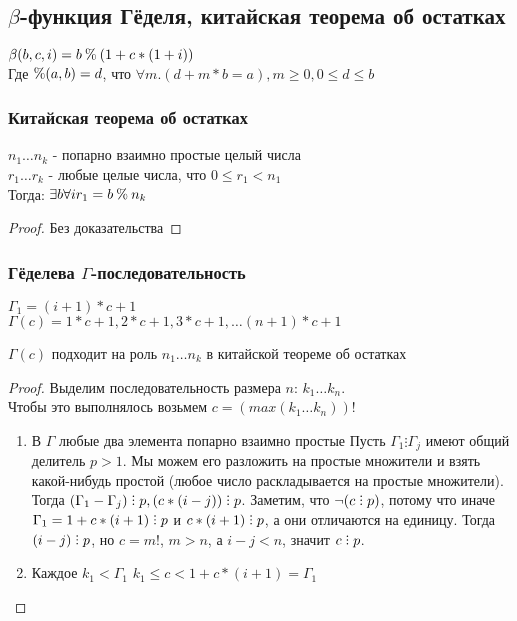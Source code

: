 \subsection{\texorpdfstring{$\beta$}{Бета}-функция Гёделя, китайская теорема об остатках}
\label{sec-11-3}
$\beta(b, c, i) = b \mathbin{\%} (1 + c * (1 + i))$\\
Где $\mathbin{\%}(a, b) = d$, что $\forall m . (d + m * b = a), m \geq 0, 0 \leq d \leq b$

\subsubsection{Китайская теорема об остатках}
\label{sec-11-3-1}
\begin{theorem}
$n_1\dots n_k$ - попарно взаимно простые целый числа\\
$r_1\dots r_k$ - любые целые числа, что $0 \leq r_1 < n_1$\\
Тогда: $\exists b \forall i  r_1 = b \mathbin{\%} n_k$
\end{theorem}
\begin{proof}
Без доказательства
\end{proof}

\subsubsection{Гёделева \texorpdfstring{$\Gamma$}{Г}-последовательность}
\label{sec-11-3-2}
$\Gamma_1 = (i + 1) * c + 1$\\
$\Gamma(c) = 1 * c + 1, 2 * c + 1, 3 * c + 1, \ldots (n + 1) * c + 1$
\begin{theorem}
$\Gamma(c)$ подходит на роль $n_1 \ldots n_k$ в китайской теореме об остатках
\end{theorem}
\begin{proof}
Выделим последовательность размера $n$: $k_1 \ldots k_n$.\\
Чтобы это выполнялось возьмем $c = (max(k_1\dots k_n))!$
\begin{enumerate}
\item В $\Gamma$ любые два элемента попарно взаимно простые
\label{sec-11-3-2-1}
Пусть $\Gamma_1 \vdots \Gamma_j$ имеют общий делитель $p > 1$. Мы можем его разложить на простые множители и взять какой-нибудь простой (любое число раскладывается на простые множители).\\
Тогда $(\Gamma_1 - \Gamma_j) \divby p, (c * (i - j)) \divby p$. Заметим, что $\lnot (c \divby p)$, потому что иначе $\Gamma_1 = 1 + c * (i + 1) \divby p$ и $c * (i + 1) \divby p$, а они отличаются на единицу. Тогда $(i - j) \divby p$, но $c = m!$, $m > n$, а $i - j < n$, значит $c \divby p$.
\item Каждое $k_1 < \Gamma_1$
\label{sec-11-3-2-2}
$k_1 \leq c < 1 + c * (i + 1) = \Gamma_1$
\end{enumerate}
\end{proof}
